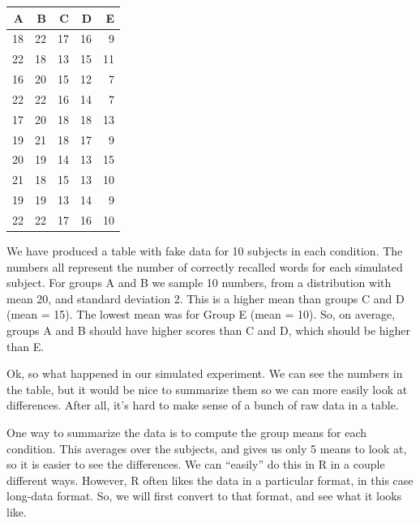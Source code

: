 \begin{tabular}{r|r|r|r|r}
\hline
A & B & C & D & E\\
\hline
18 & 22 & 17 & 16 & 9\\
\hline
22 & 18 & 13 & 15 & 11\\
\hline
16 & 20 & 15 & 12 & 7\\
\hline
22 & 22 & 16 & 14 & 7\\
\hline
17 & 20 & 18 & 18 & 13\\
\hline
19 & 21 & 18 & 17 & 9\\
\hline
20 & 19 & 14 & 13 & 15\\
\hline
21 & 18 & 15 & 13 & 10\\
\hline
19 & 19 & 13 & 14 & 9\\
\hline
22 & 22 & 17 & 16 & 10\\
\hline
\end{tabular}

We have produced a table with fake data for 10 subjects in each
condition. The numbers all represent the number of correctly recalled
words for each simulated subject. For groups A and B we sample 10
numbers, from a distribution with mean 20, and standard deviation 2.
This is a higher mean than groups C and D (mean = 15). The lowest mean
was for Group E (mean = 10). So, on average, groups A and B should have
higher scores than C and D, which should be higher than E.

Ok, so what happened in our simulated experiment. We can see the numbers
in the table, but it would be nice to summarize them so we can more
easily look at differences. After all, it's hard to make sense of a
bunch of raw data in a table.

One way to summarize the data is to compute the group means for each
condition. This averages over the subjects, and gives us only 5 means to
look at, so it is easier to see the differences. We can ``easily'' do
this in R in a couple different ways. However, R often likes the data in
a particular format, in this case long-data format. So, we will first
convert to that format, and see what it looks like.

\begin{Shaded}
\begin{Highlighting}[]
\NormalTok{(}\NormalTok{(}\NormalTok{(}\NormalTok{,}\NormalTok{,}\NormalTok{,}\NormalTok{,}\NormalTok{),}\NormalTok{),}
\NormalTok{(long_data[}\NormalTok{:}\NormalTok{,],}\NormalTok{)}
\end{Highlighting}
\end{Shaded}

